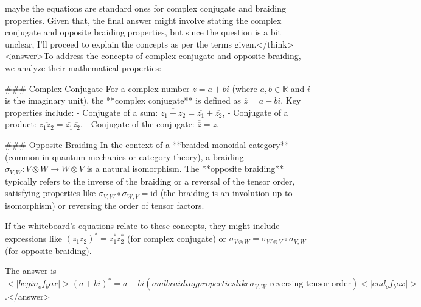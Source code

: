maybe the equations are standard ones for complex conjugate and braiding properties. Given that, the final answer might involve stating the complex conjugate and opposite braiding properties, but since the question is a bit unclear, I'll proceed to explain the concepts as per the terms given.</think><answer>To address the concepts of complex conjugate and opposite braiding, we analyze their mathematical properties:  

### Complex Conjugate  
For a complex number \( z = a + bi \) (where \( a, b \in \mathbb{R} \) and \( i \) is the imaginary unit), the **complex conjugate** is defined as \( \overline{z} = a - bi \). Key properties include:  
- Conjugate of a sum: \( \overline{z_1 + z_2} = \overline{z_1} + \overline{z_2} \),  
- Conjugate of a product: \( \overline{z_1 z_2} = \overline{z_1} \overline{z_2} \),  
- Conjugate of the conjugate: \( \overline{\overline{z}} = z \).  

### Opposite Braiding  
In the context of a **braided monoidal category** (common in quantum mechanics or category theory), a braiding \( \sigma_{V,W} : V \otimes W \to W \otimes V \) is a natural isomorphism. The **opposite braiding** typically refers to the inverse of the braiding or a reversal of the tensor order, satisfying properties like \( \sigma_{V,W} \circ \sigma_{W,V} = \text{id} \) (the braiding is an involution up to isomorphism) or reversing the order of tensor factors.  

If the whiteboard’s equations relate to these concepts, they might include expressions like \( (z_1 z_2)^* = z_1^* z_2^* \) (for complex conjugate) or \( \sigma_{V \otimes W} = \sigma_{W \otimes V} \circ \sigma_{V,W} \) (for opposite braiding).  

The answer is \(<|begin_of_box|>(a + bi)^* = a - bi (and braiding properties like \sigma_{V,W} \text{ reversing tensor order})<|end_of_box|>\).</answer>